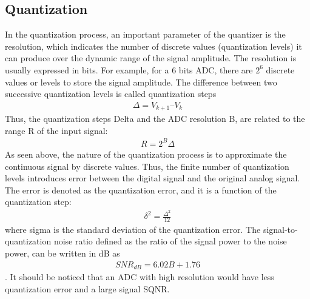 \subsection{Quantization}
In the quantization process, an important parameter of the quantizer is the resolution, which indicates the number of discrete values (quantization levels) it can produce over the dynamic range of the signal amplitude. The resolution is usually expressed in bits. For example, for a 6 bits ADC, there are $2^6$ discrete values or levels to store the signal amplitude. The difference between two successive quantization levels is called quantization steps \citep{nakhostin2017signal}
\begin{align}
\Delta = V_{k+1} – V_k 
\end{align}
Thus, the quantization steps Delta and the ADC resolution B, are related to the range R of the input signal:
\begin{align}
R=2^B\Delta    
\end{align}
As seen above, the nature of the quantization process is to approximate the continuous signal by discrete values. Thus, the finite number of quantization levels introduces error between the digital signal and the original analog signal. The error is denoted as the quantization error, and it is a function of the quantization step:
\begin{align} \label{eq:ADC_quanError}
\delta^2=\frac{\Delta^2}{12}     
\end{align}
where sigma is the standard deviation of the quantization error. The signal-to-quantization noise ratio  defined as the ratio of the signal power to the noise power, can be written in dB as \citep{nakhostin2017signal}
\begin{align} \label{eq:ADC_snrDB}
SNR_{dB} = 6.02B + 1.76    
\end{align}. It should be noticed that an ADC with high resolution would have less quantization error and a large signal SQNR.
